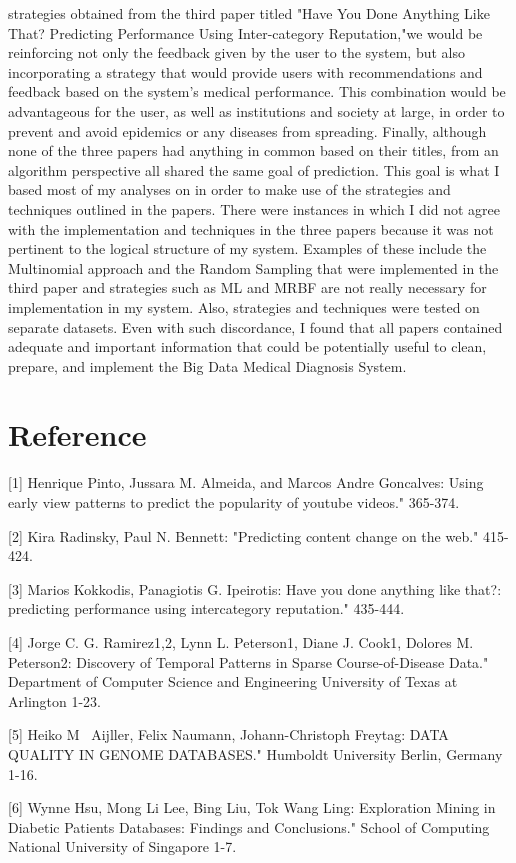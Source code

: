 \documentclass{sig-alternate}
\begin{document}
strategies obtained from the third paper titled "Have You Done Anything Like That? Predicting Performance Using Inter-category Reputation,"we would be reinforcing not only the feedback given by the user to the system, but also incorporating a strategy that would provide users with recommendations and feedback based on the system's medical performance. This combination would be advantageous for the user, as well as institutions and society at large, in order to prevent and avoid epidemics or any diseases from spreading. Finally, although none of the three papers had anything in common based on their titles, from an algorithm perspective all shared the same goal of prediction. This goal is what I based most of my analyses on in order to make use of the strategies and techniques outlined in the papers. There were instances in which I did not agree with the implementation and techniques in the three papers because it was not pertinent to the logical structure of my system. Examples of these include the Multinomial approach and the Random Sampling that were implemented in the third paper and strategies such as ML and MRBF are not really necessary for implementation in my system. Also, strategies and techniques were tested on separate datasets. Even with such discordance, I found that all papers contained adequate and important information that could be potentially useful to clean, prepare, and implement the Big Data Medical Diagnosis System.


\section{Reference}
\label{Reference}

[1] Henrique Pinto, Jussara M. Almeida, and Marcos Andre Goncalves: Using early view patterns to predict the popularity of youtube videos." 365-374.\newline

[2] Kira Radinsky, Paul N. Bennett: "Predicting content change on the web." 415-424.\newline

[3] Marios Kokkodis, Panagiotis G. Ipeirotis: Have you done anything like that?: predicting performance using intercategory reputation." 435-444.\newline

[4] Jorge C. G. Ramirez1,2, Lynn L. Peterson1, Diane J. Cook1, Dolores M. Peterson2: Discovery of Temporal Patterns in Sparse Course-of-Disease Data." Department of Computer Science and Engineering University of Texas at Arlington 1-23.\newline

[5] Heiko M~ Aijller, Felix Naumann, Johann-Christoph Freytag: DATA QUALITY IN GENOME DATABASES." Humboldt University Berlin, Germany 1-16.\newline

[6] Wynne Hsu, Mong Li Lee, Bing Liu, Tok Wang Ling: Exploration Mining in Diabetic Patients Databases: Findings and Conclusions." School of Computing National University of Singapore 1-7.\newline



\end{document}
